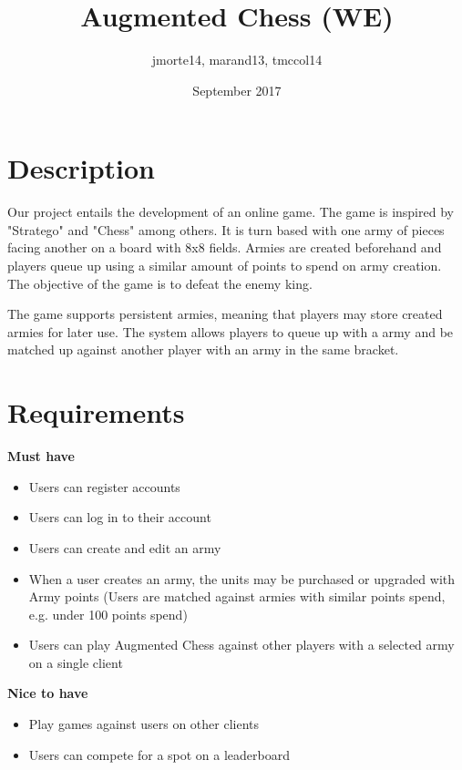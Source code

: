 \documentclass{article}
\title{Augmented Chess (WE)}
\author{jmorte14, marand13, tmccol14}
\date{September 2017}
\begin{document}
\maketitle

\section{Description}
Our project entails the development of an online game. The game is inspired by "Stratego" and "Chess" among others. It is turn based with one army of pieces facing another on a board with 8x8 fields. Armies are created beforehand and players queue up using a similar amount of points to spend on army creation. The objective of the game is to defeat the enemy king.

The game supports persistent armies, meaning that players may store created armies for later use. The system allows players to queue up with a army and be matched up against another player with an army in the same bracket.

\section{Requirements}
\textbf{Must have}
\begin{itemize}
    \item Users can register accounts
    \item Users can log in to their account
    \item Users can create and edit an army
    \item When a user creates an army, the units may be purchased or upgraded with Army points (Users are matched against armies with similar points spend, e.g. under 100 points spend)
    \item Users can play Augmented Chess against other players with a selected army on a single client
\end{itemize}
\textbf{Nice to have}
\begin{itemize}
    \item Play games against users on other clients
    \item Users can compete for a spot on a leaderboard
\end{itemize}
\end{document}
